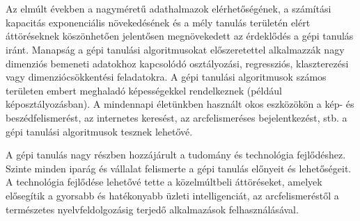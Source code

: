 \section{\bevezetes}


Az elmúlt években a nagyméretű adathalmazok elérhetőségének, a számítási kapacitás exponenciális növekedésének és a mély tanulás területén elért áttöréseknek köszönhetően jelentősen megnövekedett az érdeklődés a gépi tanulás iránt. Manapság a gépi tanulási algoritmusokat előszeretettel alkalmazzák nagy dimenziós bemeneti adatokhoz kapcsolódó osztályozási, regressziós, klaszterezési vagy dimenziócsökkentési feladatokra. A gépi tanulási algoritmusok számos területen embert meghaladó képességekkel rendelkeznek (például képosztályozásban). A mindennapi életünkben használt okos eszközökön a kép- és beszédfelismerést, az internetes keresést, az arcfelismeréses bejelentkezést, stb. a gépi tanulási algoritmusok tesznek lehetővé.


A gépi tanulás nagy részben hozzájárult a tudomány és technológia fejlődéshez. Szinte minden iparág és vállalat felismerte a gépi tanulás előnyeit és lehetőségeit. A technológia fejlődése lehetővé tette a közelmúltbeli áttöréseket, amelyek elősegítik a gyorsabb és hatékonyabb üzleti intelligenciát, az arcfelismeréstől a természetes nyelvfeldolgozásig terjedő alkalmazások felhasználásával.



